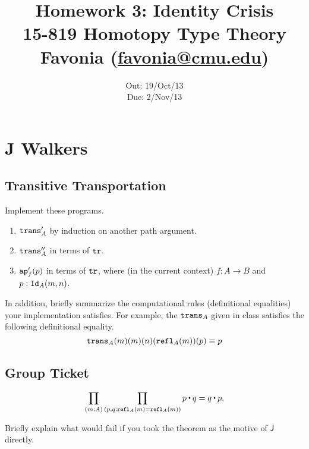 \documentclass[12pt]{article}
\title{\Large\textbf{
  Homework 3: Identity Crisis}
\normalsize\\
15-819 Homotopy Type Theory\\
Favonia (\href{mailto:favonia@cmu.edu}{favonia@cmu.edu})}
\author{}
\date{%
Out: 19/Oct/13\\
Due: 2/Nov/13
}
\begin{document}
\maketitle

\section{J Walkers}

\subsection{Transitive Transportation}

\begin{task}
  Implement these programs.
  \begin{enumerate}
    \item $\mathtt{trans}'_A$ by induction on another path argument.
    \item $\mathtt{trans}''_A$ in terms of $\mathtt{tr}$.
    \item
      $\mathtt{ap}'_f(p)$ in terms of $\mathtt{tr}$,
      where (in the current context) $f : A \to B$
      and $p : \mathtt{Id}_A(m,n)$.
  \end{enumerate}
  In addition, briefly summarize the computational rules
  (definitional equalities)
  your implementation satisfies.
  For example, the $\mathtt{trans}_A$ given in class
  satisfies the following definitional equality.
  \[
    \mathtt{trans}_A(m)(m)(n)(\mathtt{refl}_A(m))(p) \equiv p
  \]
\end{task}

\subsection{Group Ticket}

\[
  \prod_{(m{:}A)}\prod_{(p,q{:}\refl_A(m)=\refl_A(m))}p\concat q = q\concat p,
\]
\begin{bonus}
Briefly explain what would fail if you took the theorem as the motive of $\mathsf{J}$ directly.
\end{bonus}
\end{document}
